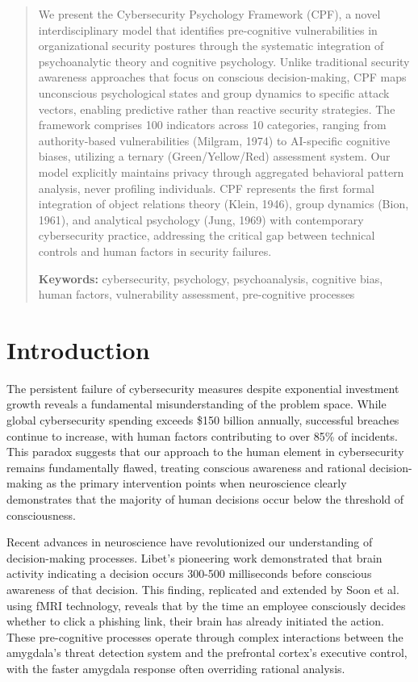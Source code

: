 \documentclass[11pt,a4paper]{article}
\begin{document}
\begin{abstract}
\noindent
We present the Cybersecurity Psychology Framework (CPF), a novel interdisciplinary model that identifies pre-cognitive vulnerabilities in organizational security postures through the systematic integration of psychoanalytic theory and cognitive psychology. Unlike traditional security awareness approaches that focus on conscious decision-making, CPF maps unconscious psychological states and group dynamics to specific attack vectors, enabling predictive rather than reactive security strategies. The framework comprises 100 indicators across 10 categories, ranging from authority-based vulnerabilities (Milgram, 1974) to AI-specific cognitive biases, utilizing a ternary (Green/Yellow/Red) assessment system. Our model explicitly maintains privacy through aggregated behavioral pattern analysis, never profiling individuals. CPF represents the first formal integration of object relations theory (Klein, 1946), group dynamics (Bion, 1961), and analytical psychology (Jung, 1969) with contemporary cybersecurity practice, addressing the critical gap between technical controls and human factors in security failures.

\vspace{0.5em}
\noindent\textbf{Keywords:} cybersecurity, psychology, psychoanalysis, cognitive bias, human factors, vulnerability assessment, pre-cognitive processes
\end{abstract}

\vspace{1cm}

\section{Introduction}

The persistent failure of cybersecurity measures despite exponential investment growth reveals a fundamental misunderstanding of the problem space. While global cybersecurity spending exceeds \$150 billion annually\cite{gartner2023}, successful breaches continue to increase, with human factors contributing to over 85\% of incidents\cite{verizon2023}. This paradox suggests that our approach to the human element in cybersecurity remains fundamentally flawed, treating conscious awareness and rational decision-making as the primary intervention points when neuroscience clearly demonstrates that the majority of human decisions occur below the threshold of consciousness.

Recent advances in neuroscience have revolutionized our understanding of decision-making processes. Libet's pioneering work\cite{libet1983} demonstrated that brain activity indicating a decision occurs 300-500 milliseconds before conscious awareness of that decision. This finding, replicated and extended by Soon et al.\cite{soon2008} using fMRI technology, reveals that by the time an employee consciously decides whether to click a phishing link, their brain has already initiated the action. These pre-cognitive processes operate through complex interactions between the amygdala's threat detection system and the prefrontal cortex's executive control, with the faster amygdala response often overriding rational analysis\cite{ledoux2000}.
\end{document}
